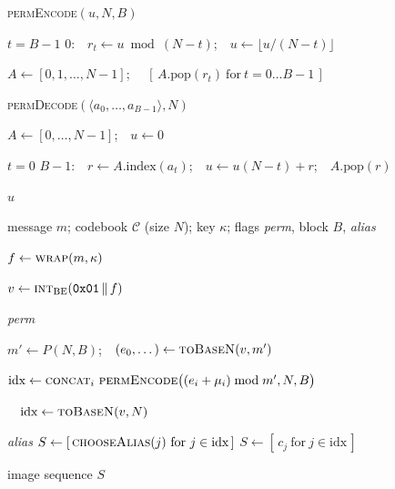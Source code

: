 \begin{algorithm}[t]
\caption{Lehmer block coding (\textsc{permEncode} / \textsc{permDecode})}\label{alg:lehmer}
\begin{pseudo}
\item {} \textsc{permEncode}$(u,N,B)$ 
\item \Ind {} $t=B-1$  $0$:\ \ $r_t\gets u\bmod(N-t)$;\ \ $u\gets\lfloor u/(N-t)\rfloor$
\item \Ind $A\gets[0,1,\dots,N-1]$;\ \  $[\,A.\text{pop}(r_t)\ \text{for}\ t=0\dots B-1\,]$
\item {} \textsc{permDecode}$(\langle a_0,\dots,a_{B-1}\rangle,N)$ 
\item \Ind $A\gets[0,\dots,N-1]$;\ \ $u\gets0$
\item \Ind {} $t=0$  $B-1$:\ \ $r\gets A.\text{index}(a_t)$;\ \ $u\gets u(N-t)+r$;\ \ $A.\text{pop}(r)$
\item \Ind {} $u$ 
\end{pseudo}
\end{algorithm}

\begin{algorithm}[t]
\caption{\textsc{Encode}: message $\to$ ordered image sequence}\label{alg:encode}
\begin{pseudo}
\item {} message $m$; codebook $\mathcal{C}$ (size $N$); key $\kappa$;
      flags \textit{perm}, block $B$, \textit{alias}
\item $f\gets\textsc{wrap}(m,\kappa)$ 
\item $v\gets\textsc{int}_{\mathrm{BE}}(\mathtt{0x01}\,\Vert\, f)$ 
\item {} \textit{perm} 
\item \Ind $m'\gets P(N,B)$;\ \ $(e_0,\dots)\gets\textsc{toBaseN}(v,m')$
\item \Ind $\text{idx}\gets\textsc{concat}_i\ \textsc{permEncode}\big((e_i+\mu_i)\bmod m',N,B\big)$ 
\item {}\ \ $\text{idx}\gets\textsc{toBaseN}(v,N)$ 
\item {} \textit{alias}  $S\gets[\,\textsc{chooseAlias}(j)\ \text{for}\ j\in\text{idx}\,]$
       $S\gets[\,c_j\ \text{for}\ j\in\text{idx}\,]$
\item {} image sequence $S$
\end{pseudo}
\end{algorithm}

